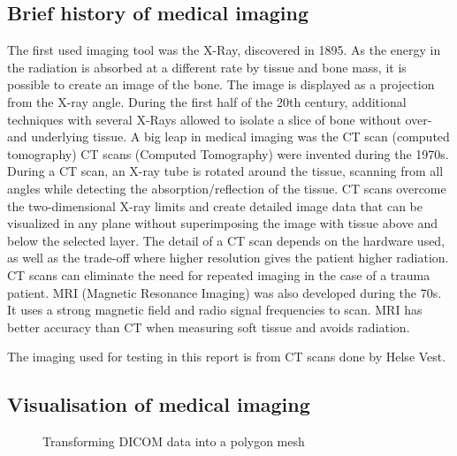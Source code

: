 \documentclass[a4paper]{report}
\begin{document}
\subsection{Brief history of medical imaging}
The first used imaging tool was the X-Ray, discovered in 1895\cite{hamblen_outline_2010}\cite{suetens_fundamentals_2017}. As the energy in the radiation is absorbed at a different rate by tissue and bone mass, it is possible to create an image of the bone. The image is displayed as a projection from the X-ray angle. During the first half of the 20th century, additional techniques with several X-Rays allowed to isolate a slice of bone without over- and underlying tissue. A big leap in medical imaging was the CT scan (computed tomography)\cite{bradley_history_2008}
CT scans (Computed Tomography) were invented during the 1970s. During a CT scan, an X-ray tube is rotated around the tissue, scanning from all angles while detecting the absorption/reflection of the tissue. CT scans overcome the two-dimensional X-ray limits and create detailed image data that can be visualized in any plane without superimposing the image with tissue above and below the selected layer\cite{hamblen_outline_2010}. The detail of a CT scan depends on the hardware used, as well as the trade-off where higher resolution gives the patient higher radiation\cite{bradley_history_2008}. CT scans can eliminate the need for repeated imaging in the case of a trauma patient\cite{swiontkowski_manual_2013}.
MRI (Magnetic Resonance Imaging) was also developed during the 70s. It uses a strong magnetic field and radio signal frequencies to scan. MRI has better accuracy than CT when measuring soft tissue and avoids radiation.


The imaging used for testing in this report is from CT scans done by Helse Vest.

\subsection{Visualisation of medical imaging}

\begin{figure}[h!]
    \centering
	\hfill
  \caption{Transforming DICOM data into a polygon mesh}
\end{figure}
\end{document}
